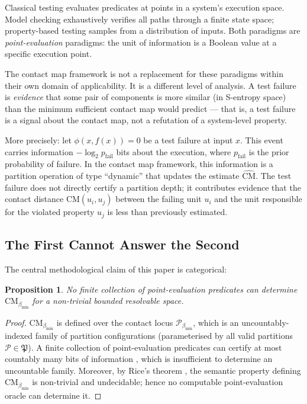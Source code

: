 \documentclass[12pt,a4paper,twocolumn]{article}
\theoremstyle{plain}
\newtheorem{proposition}[theorem]{Proposition}
\theoremstyle{definition}
\theoremstyle{remark}
\newcommand{\Part}{\mathcal{P}}
\newcommand{\CM}{\mathrm{CM}}
\newcommand{\bmin}{\beta_{\min}}
\newcommand{\CMbmin}{\CM_{\bmin}}
\begin{document}
Classical testing \citep{clarke1999model, baier2008principles} evaluates
predicates at points in a system's execution space.  Model checking
exhaustively verifies all paths through a finite state space; property-based
testing samples from a distribution of inputs.  Both paradigms are
\emph{point-evaluation} paradigms: the unit of information is a Boolean value
at a specific execution point.

The contact map framework is not a replacement for these paradigms within
their own domain of applicability.  It is a different level of analysis.  A
test failure is \emph{evidence} that some pair of components is more similar
(in S-entropy space) than the minimum sufficient contact map would predict ---
that is, a test failure is a signal about the contact map, not a refutation of
a system-level property.

More precisely: let $\phi(x, f(x)) = 0$ be a test failure at input $x$.  This
event carries information $-\log_2 p_{\text{fail}}$ bits about the execution,
where $p_{\text{fail}}$ is the prior probability of failure.  In the contact
map framework, this information is a partition operation of type ``dynamic''
that updates the estimate $\hat{\CM}$.  The test failure does not directly
certify a partition depth; it contributes evidence that the contact distance
$\CM(u_i, u_j)$ between the failing unit $u_i$ and the unit responsible for
the violated property $u_j$ is less than previously estimated.

\subsection{The First Cannot Answer the Second}

The central methodological claim of this paper is categorical:

\begin{proposition}
No finite collection of point-evaluation predicates can determine $\CMbmin$ for
a non-trivial bounded resolvable space.
\end{proposition}

\begin{proof}
$\CMbmin$ is defined over the contact locus $\Part_{\bmin}$, which is an
uncountably-indexed family of partition configurations (parameterised by all
valid partitions $\Part \in \mathfrak{P}$).  A finite collection of
point-evaluation predicates can certify at most countably many bits of
information \citep{cover2006elements}, which is insufficient to determine an
uncountable family.  Moreover, by Rice's theorem \citep{rice1953classes}, the
semantic property defining $\CMbmin$ is non-trivial and undecidable; hence no
computable point-evaluation oracle can determine it.
\end{proof}
\end{document}
